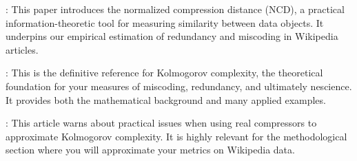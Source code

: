 \cite{li2004similarity}: This paper introduces the normalized compression distance (NCD), a practical information-theoretic tool for measuring similarity between data objects. It underpins our empirical estimation of redundancy and miscoding in Wikipedia articles.

\cite{li2013introduction}: This is the definitive reference for Kolmogorov complexity, the theoretical foundation for your measures of miscoding, redundancy, and ultimately nescience. It provides both the mathematical background and many applied examples.

\cite{cebrian2005common}: This article warns about practical issues when using real compressors to approximate Kolmogorov complexity. It is highly relevant for the methodological section where you will approximate your metrics on Wikipedia data.




